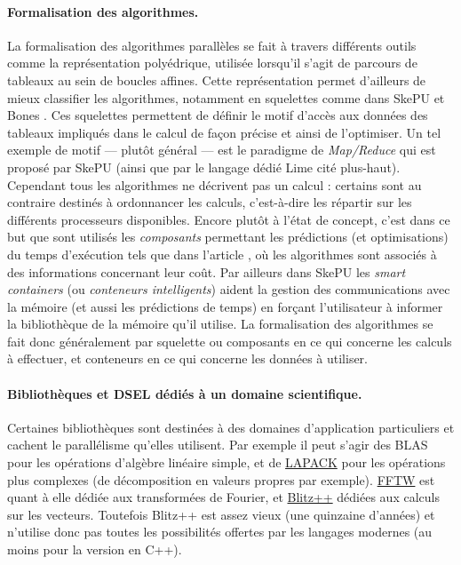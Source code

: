 \paragraph{Formalisation des algorithmes.}
La formalisation des algorithmes parallèles se fait à travers différents outils comme la représentation polyédrique, utilisée lorsqu'il s'agit de parcours de tableaux au sein de boucles affines. Cette représentation permet d'ailleurs de mieux classifier les algorithmes, notamment en squelettes comme dans \textsf{SkePU} et \textsf{Bones} \cite{Art4,Art3,Art9}. Ces squelettes permettent de définir le motif d'accès aux données des tableaux impliqués dans le calcul de façon précise et ainsi de l'optimiser. Un tel exemple de motif --- plutôt général --- est le paradigme de \emph{Map/Reduce} qui est proposé par \textsf{SkePU} \cite{MstThs1} (ainsi que par le langage dédié \textsf{Lime} cité plus-haut). Cependant tous les algorithmes ne décrivent pas un calcul : certains sont au contraire destinés à ordonnancer les calculs, c'est-à-dire les répartir sur les différents processeurs disponibles. Encore plutôt à l'état de concept, c'est dans ce but que sont utilisés les \emph{composants} permettant les prédictions (et optimisations) du temps d'exécution tels que dans l'article \cite{Art7}, où les algorithmes sont associés à des informations concernant leur coût. Par ailleurs dans \textsf{SkePU} \cite[p.~78]{Ths1} les \emph{smart containers} (ou \emph{conteneurs intelligents}) aident la gestion des communications avec la mémoire (et aussi les prédictions de temps) en forçant l'utilisateur à informer la bibliothèque de la mémoire qu'il utilise. La formalisation des algorithmes se fait donc généralement par squelette ou composants en ce qui concerne les calculs à effectuer, et conteneurs en ce qui concerne les données à utiliser.

\paragraph{Bibliothèques et DSEL dédiés à un domaine scientifique.}
Certaines bibliothèques sont destinées à des domaines d'application particuliers et cachent le parallélisme qu'elles utilisent. Par exemple il peut s'agir des \textsf{BLAS} pour les opérations d'algèbre linéaire simple, et de \textsf{\href{http://www.netlib.org/lapack/}{LAPACK}} pour les opérations plus complexes (de décomposition en valeurs propres par exemple). \textsf{\href{http://www.fftw.org/}{FFTW}} est quant à elle dédiée aux transformées de Fourier, et \textsf{\href{http://sourceforge.net/projects/blitz/}{Blitz++}} dédiées aux calculs sur les vecteurs. Toutefois \textsf{Blitz++} est assez vieux (une quinzaine d'années) et n'utilise donc pas toutes les possibilités offertes par les langages modernes (au moins pour la version en \textsf{C++}).


